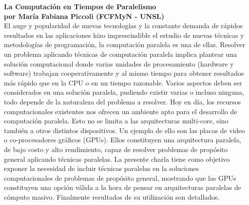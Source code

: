 \documentclass[12pt, a4paper]{article}
\newcommand{\charla}[3]{
	{\large\bf#1}\\
	{\bf por #2}\\
	#3\\
}
\begin{document}
\charla
{La Computación en Tiempos de Paralelismo}
{María Fabiana Piccoli (FCFMyN - UNSL)}
{El auge y popularidad de nuevas tecnologías y la constante demanda de rápidos resultados en las aplicaciones hizo imprescindible el estudio de nuevas técnicas y metodologías de programación, la computación paralela es una de ellas.
Resolver un problema aplicando técnicas de computación paralela implica plantear una solución computacional donde varias unidades de procesamiento (hardware y software) trabajan cooperativamente y al mismo tiempo para obtener resultados más rápido que en la CPU o en un tiempo razonable.
Varios aspectos deben ser considerados en una solución paralela, pudiendo existir varias o incluso ninguna, todo depende de la naturaleza del problema a resolver.
Hoy en día, los recursos computacionales existentes nos ofrecen un ambiente apto para el desarrollo de computación paralela. Esto no se limita a las arquitecturas multi-core, sino también a otros distintos dispositivos. Un ejemplo de ello son las placas de video o co-procesadores gráficos (GPUs). Ellos constituyen una arquitectura paralela, de bajo costo y alto rendimiento, capaz de resolver problemas de propósito general aplicando técnicas paralelas.
La presente charla tiene como objetivo exponer la necesidad de incluir técnicas paralelas en la soluciones computacionales de problemas de propósito general, mostrando que las GPUs constituyen una opción válida a la hora de pensar en arquitecturas paralelas de cómputo masivo. Finalmente resultados de su utilización son detallados.}
\end{document}
